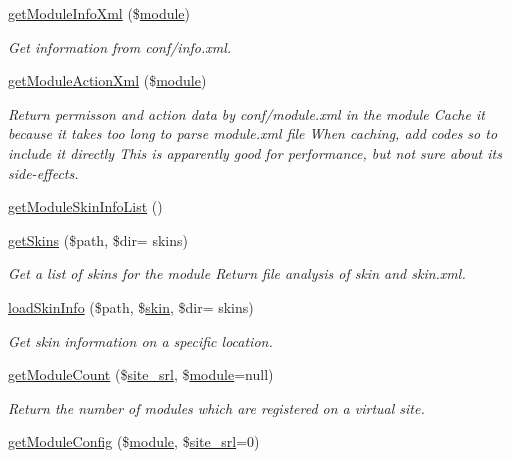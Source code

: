 \begin{DoxyCompactItemize}
\hyperlink{classmoduleModel_ae4e9287674bddc605dfc4cef77f8c1bb}{get\+Module\+Info\+Xml} (\$\hyperlink{classmodule}{module})
\begin{DoxyCompactList}\small\item\em Get information from conf/info.\+xml. \end{DoxyCompactList}\item 
\hyperlink{classmoduleModel_a2d53da77f2504357f99b93a2ad09981a}{get\+Module\+Action\+Xml} (\$\hyperlink{classmodule}{module})
\begin{DoxyCompactList}\small\item\em Return permisson and action data by conf/module.\+xml in the module Cache it because it takes too long to parse module.\+xml file When caching, add codes so to include it directly This is apparently good for performance, but not sure about its side-\/effects. \end{DoxyCompactList}\item 
\hyperlink{classmoduleModel_a9fae8e7a41eda8e384cb46d25430ae82}{get\+Module\+Skin\+Info\+List} ()
\item 
\hyperlink{classmoduleModel_af48d0cb71ef8e732a67872f80d95f884}{get\+Skins} (\$path, \$dir= \textquotesingle{}skins\textquotesingle{})
\begin{DoxyCompactList}\small\item\em Get a list of skins for the module Return file analysis of skin and skin.\+xml. \end{DoxyCompactList}\item 
\hyperlink{classmoduleModel_af2f585723dfb8b8993f0e884136e45bb}{load\+Skin\+Info} (\$path, \$\hyperlink{ko_8install_8php_ab0f2b49fdb57754496b34f6b880cdeaf}{skin}, \$dir= \textquotesingle{}skins\textquotesingle{})
\begin{DoxyCompactList}\small\item\em Get skin information on a specific location. \end{DoxyCompactList}\item 
\hyperlink{classmoduleModel_a2b22943c4d212c8284ef9780e0ebf3bd}{get\+Module\+Count} (\$\hyperlink{ko_8install_8php_a8b1406b4ad1048041558dce6bfe89004}{site\+\_\+srl}, \$\hyperlink{classmodule}{module}=null)
\begin{DoxyCompactList}\small\item\em Return the number of modules which are registered on a virtual site. \end{DoxyCompactList}\item 
\hyperlink{classmoduleModel_ae8005c8ab7ee3b9e6ddd7f71bb2b4698}{get\+Module\+Config} (\$\hyperlink{classmodule}{module}, \$\hyperlink{ko_8install_8php_a8b1406b4ad1048041558dce6bfe89004}{site\+\_\+srl}=0)

\end{DoxyCompactItemize}
